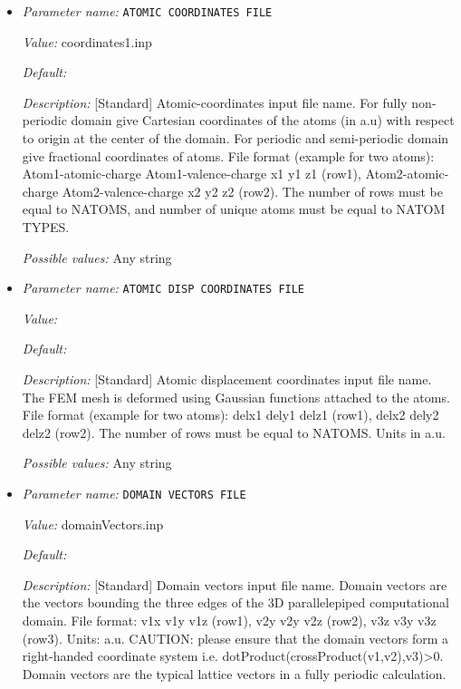 \begin{itemize}
\item {\it Parameter name:} {\tt ATOMIC COORDINATES FILE}
\label{parameters:Geometry/ATOMIC COORDINATES FILE}
\label{parameters:Geometry/ATOMIC_20COORDINATES_20FILE}


{\it Value:} coordinates1.inp


{\it Default:} 


{\it Description:} [Standard] Atomic-coordinates input file name. For fully non-periodic domain give Cartesian coordinates of the atoms (in a.u) with respect to origin at the center of the domain. For periodic and semi-periodic domain give fractional coordinates of atoms. File format (example for two atoms): Atom1-atomic-charge Atom1-valence-charge x1 y1 z1 (row1), Atom2-atomic-charge Atom2-valence-charge x2 y2 z2 (row2). The number of rows must be equal to NATOMS, and number of unique atoms must be equal to NATOM TYPES.


{\it Possible values:} Any string
\item {\it Parameter name:} {\tt ATOMIC DISP COORDINATES FILE}
\label{parameters:Geometry/ATOMIC DISP COORDINATES FILE}
\label{parameters:Geometry/ATOMIC_20DISP_20COORDINATES_20FILE}


{\it Value:} 


{\it Default:} 


{\it Description:} [Standard] Atomic displacement coordinates input file name. The FEM mesh is deformed using Gaussian functions attached to the atoms. File format (example for two atoms): delx1 dely1 delz1 (row1), delx2 dely2 delz2 (row2). The number of rows must be equal to NATOMS. Units in a.u.


{\it Possible values:} Any string
\item {\it Parameter name:} {\tt DOMAIN VECTORS FILE}
\label{parameters:Geometry/DOMAIN VECTORS FILE}
\label{parameters:Geometry/DOMAIN_20VECTORS_20FILE}


{\it Value:} domainVectors.inp


{\it Default:} 


{\it Description:} [Standard] Domain vectors input file name. Domain vectors are the vectors bounding the three edges of the 3D parallelepiped computational domain. File format: v1x v1y v1z (row1), v2y v2y v2z (row2), v3z v3y v3z (row3). Units: a.u. CAUTION: please ensure that the domain vectors form a right-handed coordinate system i.e. dotProduct(crossProduct(v1,v2),v3)>0. Domain vectors are the typical lattice vectors in a fully periodic calculation.



\end{itemize}

